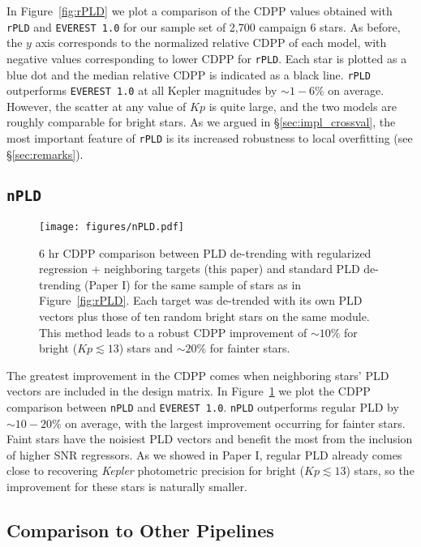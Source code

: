 \documentclass[]{emulateapj}
\newcommand{\Kp}{\ensuremath{Kp}}
\begin{document}
In Figure~\ref{fig:rPLD} we plot a comparison of the CDPP values obtained with \texttt{rPLD}
and \texttt{EVEREST 1.0} for our sample set of 2,700 campaign 6 stars. As before, the $y$
axis corresponds to the normalized relative CDPP of each model, with negative values
corresponding to lower CDPP for \texttt{rPLD}. Each star is plotted as a blue dot and the median
relative CDPP is indicated as a black line. \texttt{rPLD} outperforms \texttt{EVEREST 1.0} at all
Kepler magnitudes by ${\sim}1-6\%$ on average. However, the scatter at any value of
$\Kp$ is quite large, and the two models are roughly comparable for bright stars. As we
argued in \S\ref{sec:impl_crossval}, the most important feature of \texttt{rPLD} is
its increased robustness to local overfitting (see \S\ref{sec:remarks}).

\subsection{\texttt{nPLD}}
\begin{figure}[hbt]
  \begin{center}
      \texttt{[image: figures/nPLD.pdf]}
       \caption{6 hr CDPP comparison between PLD de-trending with regularized regression + neighboring targets
                (this paper) and standard PLD de-trending (Paper I) for the same sample of stars as in Figure~\ref{fig:rPLD}.
                Each target was de-trended with its own PLD vectors plus those of ten random bright stars
                on the same module. This method leads to a robust CDPP improvement of ${\sim}10$\% for bright ($\Kp \lesssim 13$) stars
                and ${\sim}20$\% for fainter stars.}
     \label{fig:nPLD}
  \end{center}
\end{figure}

The greatest improvement in the CDPP comes when neighboring stars' PLD vectors are included
in the design matrix. In Figure~\ref{fig:nPLD} we plot the CDPP comparison between \texttt{nPLD}
and \texttt{EVEREST 1.0}. \texttt{nPLD} outperforms regular PLD by ${\sim}10-20\%$
on average, with the largest improvement occurring for fainter stars. Faint stars have the
noisiest PLD vectors and benefit the most from the inclusion of higher SNR regressors.
As we showed in Paper I, regular PLD already comes close to recovering \emph{Kepler} photometric
precision for bright ($\Kp \lesssim 13$) stars, so the improvement for these stars is naturally
smaller.

\subsection{Comparison to Other Pipelines}
\label{sec:comparison}
\end{document}
